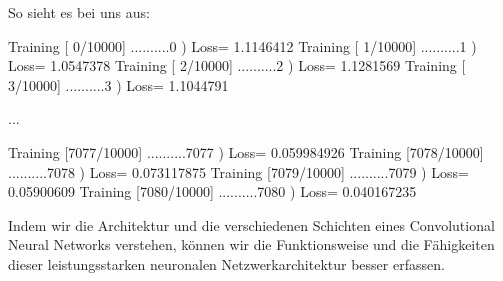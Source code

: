 So sieht es bei uns aus:

Training [   0/10000] ..........0 ) Loss= 1.1146412
Training [   1/10000] ..........1 ) Loss= 1.0547378
Training [   2/10000] ..........2 ) Loss= 1.1281569
Training [   3/10000] ..........3 ) Loss= 1.1044791

...

Training [7077/10000] ..........7077 ) Loss= 0.059984926
Training [7078/10000] ..........7078 ) Loss= 0.073117875
Training [7079/10000] ..........7079 ) Loss= 0.05900609
Training [7080/10000] ..........7080 ) Loss= 0.040167235



Indem wir die Architektur und die verschiedenen Schichten eines Convolutional Neural Networks verstehen, können wir die Funktionsweise und die Fähigkeiten dieser leistungsstarken neuronalen Netzwerkarchitektur besser erfassen.